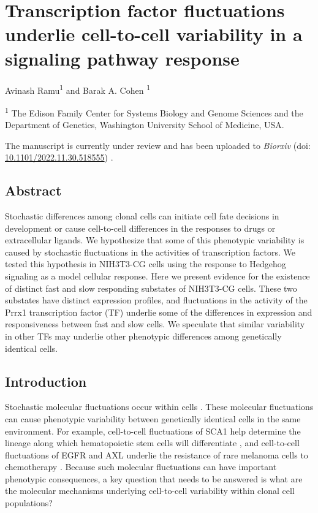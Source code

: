 \chapter{Transcription factor fluctuations underlie cell-to-cell variability in a signaling pathway response}
\label{chap:hedgehog}
\vspace{0.2in}

Avinash Ramu\textsuperscript{1} and Barak A. Cohen \textsuperscript{1}

\vspace{0.2in}

\textsuperscript{1} The Edison Family Center for Systems Biology and Genome Sciences and the Department of Genetics, Washington University School of Medicine, USA. 

\vspace{2in}

The manuscript is currently under review and has been uploaded to \textit{Biorxiv} (doi: \href{https://www.biorxiv.org/content/10.1101/2022.11.30.518555v1}{10.1101/2022.11.30.518555}) \cite{ramu2022}.

\newpage

\section{Abstract}
Stochastic differences among clonal cells can initiate cell fate decisions in development or cause cell-to-cell differences in the responses to drugs or extracellular ligands. We hypothesize that some of this phenotypic variability is caused by stochastic fluctuations in the activities of transcription factors. We tested this hypothesis in NIH3T3-CG cells using the response to Hedgehog signaling as a model cellular response. Here we present evidence for the existence of distinct fast and slow responding substates of NIH3T3-CG cells. These two substates have distinct expression profiles, and fluctuations in the activity of the Prrx1 transcription factor (TF) underlie some of the differences in expression and responsiveness between fast and slow cells. We speculate that similar variability in other TFs may underlie other phenotypic differences among genetically identical cells.

\section{Introduction}
Stochastic molecular fluctuations occur within cells \cite{Raser2004-pb,McAdams1997-zq}\cite{Ozbudak2002-dx,Elowitz2002-wn,Raj2006-oo}\cite{Blake2003-yd}. These molecular fluctuations can cause phenotypic variability between genetically identical cells in the same environment. For example, cell-to-cell fluctuations of SCA1 help determine the lineage along which hematopoietic stem cells will differentiate \cite{Chang2008-kv}, and cell-to-cell fluctuations of EGFR and AXL underlie the resistance of rare melanoma cells to chemotherapy \cite{Shaffer2017-ql,Shaffer2018-zl}. Because such molecular fluctuations can have important phenotypic consequences, a key question that needs to be answered is what are the molecular mechanisms underlying cell-to-cell variability within clonal cell populations?


